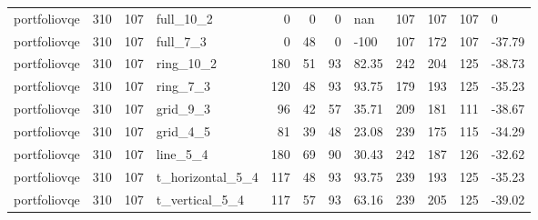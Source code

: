 \begin{longtable}{lrrlrrrlrrrl}
portfoliovqe & 310 & 107 & full\_10\_2 & 0 & 0 & 0 & nan & 107 & 107 & 107 & 0 \\
portfoliovqe & 310 & 107 & full\_7\_3 & 0 & 48 & 0 & -100 & 107 & 172 & 107 & -37.79 \\
portfoliovqe & 310 & 107 & ring\_10\_2 & 180 & 51 & 93 & 82.35 & 242 & 204 & 125 & -38.73 \\
portfoliovqe & 310 & 107 & ring\_7\_3 & 120 & 48 & 93 & 93.75 & 179 & 193 & 125 & -35.23 \\
portfoliovqe & 310 & 107 & grid\_9\_3 & 96 & 42 & 57 & 35.71 & 209 & 181 & 111 & -38.67 \\
portfoliovqe & 310 & 107 & grid\_4\_5 & 81 & 39 & 48 & 23.08 & 239 & 175 & 115 & -34.29 \\
portfoliovqe & 310 & 107 & line\_5\_4 & 180 & 69 & 90 & 30.43 & 242 & 187 & 126 & -32.62 \\
portfoliovqe & 310 & 107 & t\_horizontal\_5\_4 & 117 & 48 & 93 & 93.75 & 239 & 193 & 125 & -35.23 \\
portfoliovqe & 310 & 107 & t\_vertical\_5\_4 & 117 & 57 & 93 & 63.16 & 239 & 205 & 125 & -39.02 \\
\end{longtable}
